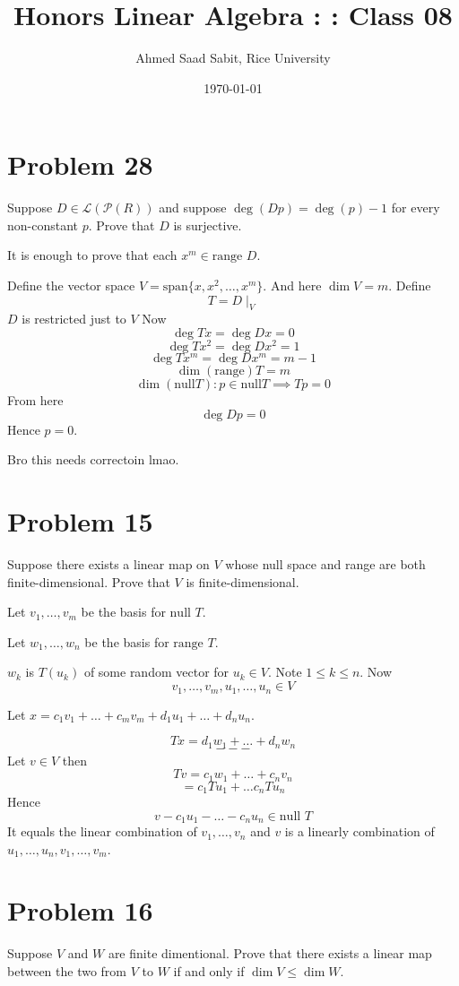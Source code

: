 \documentclass[letter]{article}
\title{Honors Linear Algebra : : Class 08}
\author{Ahmed Saad Sabit, Rice University}
\date{\today}
\begin{document}
\maketitle
{}

\section*{Problem 28}
Suppose $D \in \mathcal L(\mathcal P( R))$ and suppose $\deg(D p ) = \deg(p) -1$ for every non-constant $p$. Prove that $D$ is surjective. 

It is enough to prove that each $x ^{m} \in  \text{range }D$. 

Define the vector space $V = \text{span}\{x,x^2, \ldots, x^{m}\} $. And here $\dim V = m$. Define 
\[
T= D  \mid_V
\] $D$ is restricted just to $V$ 
Now
\[
\deg Tx = \deg Dx = 0
\] 
\[
\deg Tx^2 = \deg Dx^2 = 1
\]
\[
\deg Tx^{m} = \deg Dx^{m} = m - 1
\] 
\[
\dim (\text{range}) T = m
\] 
\[
\dim(\text{null} T ) : p \in \text{null} T \implies T p = 0
\] 
From here 
\[
\deg Dp = 0
\] 
Hence $p = 0$.

Bro this needs correctoin lmao.

\section*{Problem 15} 
Suppose there exists a linear map on $V$ whose null space and range are both
finite-dimensional. Prove that $V$ is finite-dimensional.

Let $v_1, \ldots, v_m$ be the basis for $\text{null } T$. 

Let $w_1, \ldots, w_n$ be the basis for $\text{range }T$. 

$w_k$ is $T (u_k)$ of some random vector for $u_k \in V$. Note $1 \le k \le n$. Now 
\[
v_1 , \ldots, v_m , u_1, \ldots, u_n \in V
\]

Let $x = c_1 v_1 + \ldots + c_m v_m + d_1 u_1 + \ldots + d_n u_n$. 

\[
T x = d_1 w_1 + \ldots + d_n w_n
\] 
\[
---
\] 
Let $v \in  V$ then 
\[
T v= c_1 w_1 + \ldots + c_n v_n 
\] 
\[
= c_1 T u_1 + \ldots c_n T u _n
\] 
Hence 
\[
v - c_1 u_1 - \ldots -c_n u_n \in  \text{null }T
\] 
It equals the linear combination of $v_1, \ldots, v_n$ and $v $ is a linearly combination of $u_1 , \ldots, u_n, v_1, \ldots , v_m$.


\section*{Problem 16} 
Suppose $V$ and $W$ are finite dimentional. Prove that there exists a linear map between the two from $V$ to $W$ if and only if $\dim V \le \dim W$.
\end{document}
